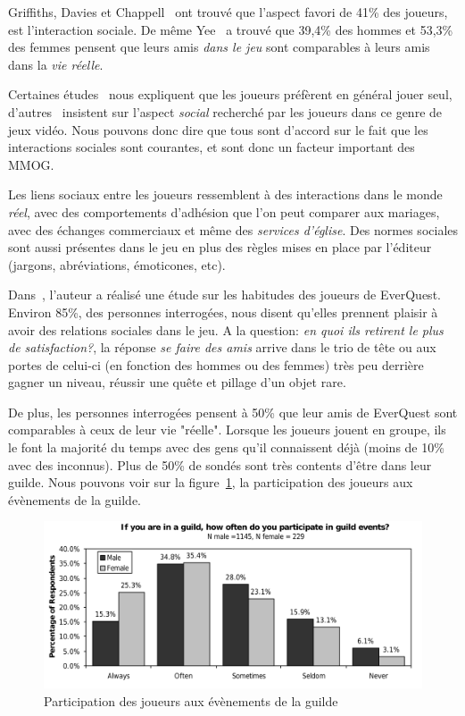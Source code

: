 Griffiths, Davies et Chappell~\cite{BreakingSteretype} ont trouvé que l'aspect favori de 41\% des joueurs, est l'interaction sociale. De même Yee~\cite{1159988} a trouvé que 39,4\% des hommes et 53,3\% des femmes pensent que leurs amis \textit{dans le jeu} sont comparables à leurs amis dans la \textit{vie réelle}.
\par Certaines études~\cite{1124834,1031667} nous expliquent que les joueurs préfèrent en général jouer seul, d'autres~\cite{1159988,Jakobsson03thesopranos} insistent sur l'aspect \textit{social} recherché par les joueurs dans ce genre de jeux vidéo. Nous pouvons donc dire que tous sont d'accord sur le fait que les interactions sociales sont courantes, et sont donc un facteur important des MMOG.
\par Les liens sociaux entre les joueurs ressemblent à des interactions dans le monde \textit{réel}, avec des comportements d'adhésion que l'on peut comparer aux mariages, avec des échanges commerciaux et même des \textit{services d'église}. Des normes sociales sont aussi présentes dans le jeu en plus des règles mises en place par l'éditeur (jargons, abréviations, émoticones, etc).

Dans~\cite{StudyEQ}, l'auteur a réalisé une étude sur les habitudes des joueurs de EverQuest. Environ 85\%, des personnes interrogées, nous disent qu'elles prennent plaisir à avoir des relations sociales dans le jeu. A la question: \textit{en quoi ils retirent le plus de satisfaction?}, la réponse \textit{se faire des amis} arrive dans le trio de tête ou aux portes de celui-ci (en fonction des hommes ou des femmes) très peu derrière gagner un niveau, réussir une quête et pillage d'un objet rare.
\par De plus, les personnes interrogées pensent à 50\% que leur amis de EverQuest sont comparables à ceux de leur vie "réelle". Lorsque les joueurs jouent en groupe, ils le font la majorité du temps avec des gens qu'il connaissent déjà (moins de 10\% avec des inconnus). Plus de 50\% de sondés sont très contents d'être dans leur guilde. Nous pouvons voir sur la figure~\ref{guildpres}, la participation des joueurs aux évènements de la guilde.
        \begin{figure}[!h]
        \centering
        \includegraphics[scale=0.75]{./Ressources/Images/studypres.png}
        \caption{Participation des joueurs aux évènements de la guilde}
        \label{guildpres}
        \end{figure}

